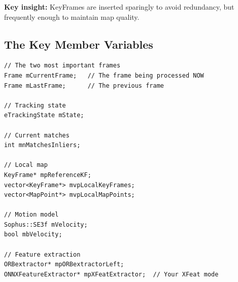 \textbf{Key insight:} KeyFrames are inserted sparingly to avoid redundancy, but frequently enough to maintain map quality.

\subsection{The Key Member Variables}

\begin{lstlisting}[caption={Important Tracking members}]
// The two most important frames
Frame mCurrentFrame;   // The frame being processed NOW
Frame mLastFrame;      // The previous frame

// Tracking state
eTrackingState mState;

// Current matches
int mnMatchesInliers;

// Local map
KeyFrame* mpReferenceKF;
vector<KeyFrame*> mvpLocalKeyFrames;
vector<MapPoint*> mvpLocalMapPoints;

// Motion model
Sophus::SE3f mVelocity;
bool mbVelocity;

// Feature extraction
ORBextractor* mpORBextractorLeft;
ONNXFeatureExtractor* mpXFeatExtractor;  // Your XFeat mode
\end{lstlisting}
